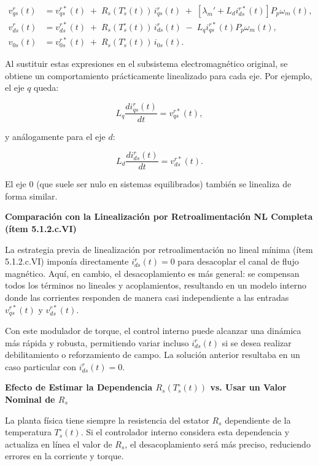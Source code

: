 \documentclass{article}
\begin{document}
\begin{equation}
\begin{aligned}
    v_{qs}^r(t) &= v_{qs}^{r*}(t) \;+\; R_s(T_s^\circ(t))\,i_{qs}^r(t) \;+\; [\lambda_m' + L_d i_{ds}^{r*}(t)] P_p \omega_m(t),\\[6pt]
    v_{ds}^r(t) &= v_{ds}^{r*}(t) \;+\; R_s(T_s^\circ(t))\,i_{ds}^r(t) \;-\; L_q i_{qs}^{r*}(t) P_p \omega_m(t),\\[6pt]
    v_{0s}(t)  &= v_{0s}^{r*}(t) \;+\; R_s(T_s^\circ(t))\,i_{0s}(t).
\end{aligned}
\end{equation}

Al sustituir estas expresiones en el subsistema electromagnético original, se obtiene un comportamiento prácticamente linealizado para cada eje. Por ejemplo, el eje \(q\) queda:

\[
    L_q \frac{d i_{qs}^r(t)}{dt} = v_{qs}^{r*}(t),
\]

y análogamente para el eje \(d\):

\[
    L_d \frac{d i_{ds}^r(t)}{dt} = v_{ds}^{r*}(t).
\]

El eje \(0\) (que suele ser nulo en sistemas equilibrados) también se linealiza de forma similar.

\textbf{Comparación con la Linealización por Retroalimentación NL Completa (ítem 5.1.2.c.VI)}

La estrategia previa de linealización por retroalimentación no lineal mínima (ítem 5.1.2.c.VI) imponía directamente \( i_{ds}^r(t)=0 \) para desacoplar el canal de flujo magnético. Aquí, en cambio, el desacoplamiento es más general: se compensan todos los términos no lineales y acoplamientos, resultando en un modelo interno donde las corrientes responden de manera casi independiente a las entradas \( v_{qs}^{r*}(t) \) y \( v_{ds}^{r*}(t) \).

Con este modulador de torque, el control interno puede alcanzar una dinámica más rápida y robusta, permitiendo variar incluso \( i_{ds}^r(t) \) si se desea realizar debilitamiento o reforzamiento de campo. La solución anterior resultaba en un caso particular con \( i_{ds}^r(t)=0 \).

\textbf{Efecto de Estimar la Dependencia \( R_s(T_s^\circ(t)) \) vs. Usar un Valor Nominal de \( R_s \)}

La planta física tiene siempre la resistencia del estator \(R_s\) dependiente de la temperatura \(T_s^\circ(t)\). Si el controlador interno considera esta dependencia y actualiza en línea el valor de \( R_s \), el desacoplamiento será más preciso, reduciendo errores en la corriente y torque.
\end{document}
